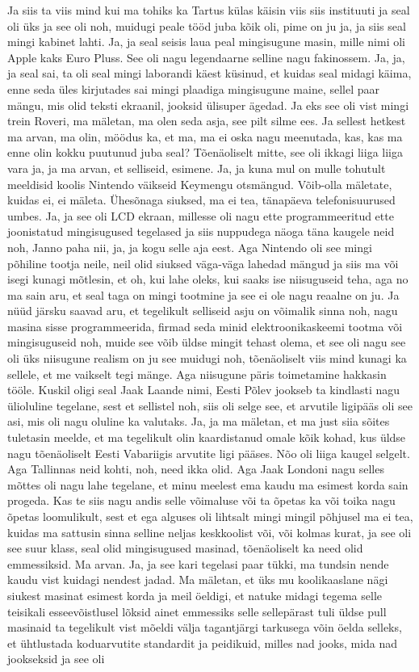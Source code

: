 Ja siis ta viis mind kui ma tohiks ka Tartus külas käisin viis siis instituuti ja seal oli üks ja see oli noh, muidugi peale tööd juba kõik oli, pime on ju ja, ja siis seal mingi kabinet lahti. Ja, ja seal seisis laua peal mingisugune masin, mille nimi oli Apple kaks Euro Pluss. See oli nagu legendaarne selline nagu fakinossem. Ja, ja, ja seal sai, ta oli seal mingi laborandi käest küsinud, et kuidas seal midagi käima, enne seda üles kirjutades sai mingi plaadiga mingisugune maine, sellel paar mängu, mis olid teksti ekraanil, jooksid ülisuper ägedad. Ja eks see oli vist mingi trein Roveri, ma mäletan, ma olen seda asja, see pilt silme ees. Ja sellest hetkest ma arvan, ma olin, möödus ka, et ma, ma ei oska nagu meenutada, kas, kas ma enne olin kokku puutunud juba seal? Tõenäoliselt mitte, see oli ikkagi liiga liiga vara ja, ja ma arvan, et selliseid, esimene. Ja, ja kuna mul on mulle tohutult meeldisid koolis Nintendo väikseid Keymengu otsmängud. Võib-olla mäletate, kuidas ei, ei mäleta. Ühesõnaga siuksed, ma ei tea, tänapäeva telefonisuurused umbes. Ja, ja see oli LCD ekraan, millesse oli nagu ette programmeeritud ette joonistatud mingisugused tegelased ja siis nuppudega näoga täna kaugele neid noh, Janno paha nii, ja, ja kogu selle aja eest. Aga Nintendo oli see mingi põhiline tootja neile, neil olid siuksed väga-väga lahedad mängud ja siis ma või isegi kunagi mõtlesin, et oh, kui lahe oleks, kui saaks ise niisuguseid teha, aga no ma sain aru, et seal taga on mingi tootmine ja see ei ole nagu reaalne on ju. Ja nüüd järsku saavad aru, et tegelikult selliseid asju on võimalik sinna noh, nagu masina sisse programmeerida, firmad seda minid elektroonikaskeemi tootma või mingisuguseid noh, muide see võib üldse mingit tehast olema, et see oli nagu see oli üks niisugune realism on ju see muidugi noh, tõenäoliselt viis mind kunagi ka sellele, et me vaikselt tegi mänge. Aga niisugune päris toimetamine hakkasin tööle. Kuskil oligi seal Jaak Laande nimi, Eesti Põlev jookseb ta kindlasti nagu ülioluline tegelane, sest et sellistel noh, siis oli selge see, et arvutile ligipääs oli see asi, mis oli nagu oluline ka valutaks. Ja, ja ma mäletan, et ma just siia sõites tuletasin meelde, et ma tegelikult olin kaardistanud omale kõik kohad, kus üldse nagu tõenäoliselt Eesti Vabariigis arvutite ligi pääses. Nõo oli liiga kaugel selgelt. Aga Tallinnas neid kohti, noh, need ikka olid. Aga Jaak Londoni nagu selles mõttes oli nagu lahe tegelane, et minu meelest ema kaudu ma esimest korda sain progeda. Kas te siis nagu andis selle võimaluse või ta õpetas ka või toika nagu õpetas loomulikult, sest et ega alguses oli lihtsalt mingi mingil põhjusel ma ei tea, kuidas ma sattusin sinna selline neljas keskkoolist või, või kolmas kurat, ja see oli see suur klass, seal olid mingisugused masinad, tõenäoliselt ka need olid emmessiksid. Ma arvan. Ja, ja see kari tegelasi paar tükki, ma tundsin nende kaudu vist kuidagi nendest jadad. Ma mäletan, et üks mu koolikaaslane nägi siukest masinat esimest korda ja meil öeldigi, et natuke midagi tegema selle teisikali esseevõistlusel lõksid ainet emmessiks selle sellepärast tuli üldse pull masinaid ta tegelikult vist mõeldi välja tagantjärgi tarkusega võin öelda selleks, et ühtlustada koduarvutite standardit ja peidikuid, milles nad jooks, mida nad jookseksid ja see oli 